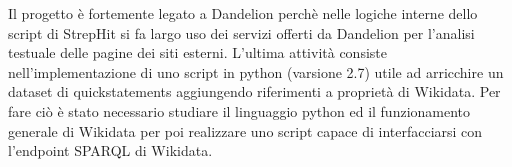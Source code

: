 Il progetto è fortemente legato a Dandelion perchè nelle logiche interne dello script di StrepHit si fa largo uso dei servizi offerti da Dandelion per l'analisi testuale delle pagine dei siti esterni.
L'ultima attività consiste nell'implementazione di uno script in python (varsione 2.7) utile ad arricchire un dataset di quickstatements aggiungendo riferimenti a proprietà di Wikidata.
Per fare ciò è stato necessario studiare il linguaggio python ed il funzionamento generale di Wikidata per poi realizzare uno script capace di interfacciarsi con l'endpoint SPARQL di Wikidata.